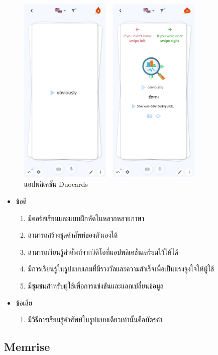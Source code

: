 \documentclass[12pt,oneside,openright,a4paper]{cpe-thai-project}
\begin{document}
\begin{figure}[!h]\centering
	\includegraphics[width=0.8\textwidth, keepaspectratio=true]{image/chap2/duocardsEX.png}
	\caption{แอปพลิเคชัน Duocards}\label{fig:duocardsEx}
\end{figure}

\begin{itemize}
	\item ข้อดี
	      \begin{enumerate}
		      \item มีคอร์สเรียนและแบบฝึกหัดในหลากหลายภาษา
		      \item สามารถสร้างชุดคำศัพท์ของตัวเองได้
		      \item สามารถเรียนรู้คำศัพท์จากวิดีโอที่แอปพลิเคชันเตรียมไว้ให้ได้
		      \item มีการเรียนรู้ในรูปแบบเกมที่มีรางวัลและความสำเร็จเพื่อเป็นแรงจูงใจให้ผู้ใช้
		      \item มีชุมชนสำหรับผู้ใช้เพื่อการแข่งขันและแลกเปลี่ยนข้อมูล
	      \end{enumerate}
	\item ข้อเสีย
	      \begin{enumerate}
		      \item มีวิธีการเรียนรู้คำศัพท์ในรูปแบบเดียวเท่านั้นคือบัตรคำ
	      \end{enumerate}
\end{itemize}

\pagebreak
\subsection{Memrise \cite{Memrise}}
\end{document}
